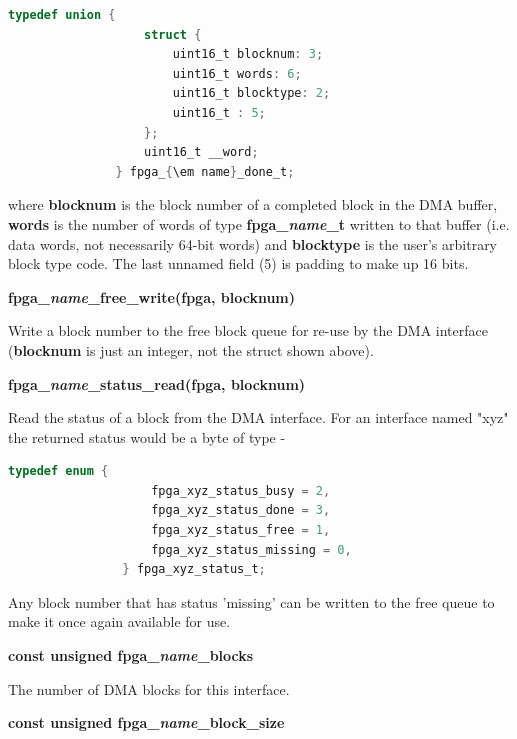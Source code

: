             \begin{lstlisting}[gobble=12, language=C]
               typedef union {
                   struct {
                       uint16_t blocknum: 3;
                       uint16_t words: 6;
                       uint16_t blocktype: 2;
                       uint16_t : 5;
                   };
                   uint16_t __word;
               } fpga_{\em name}_done_t;
            \end{lstlisting}
            where {\bf blocknum} is the
            block number of a completed block in the DMA buffer,
            {\bf words} is the number of words of type {\bf fpga\_{\em name}\_t}
            written to that buffer (i.e. data words, not necessarily 64-bit words)
            and {\bf blocktype} is the user's arbitrary block type code. The
            last unnamed field (5) is padding to make up 16 bits.
            
            {\bf fpga\_{\em name}\_free\_write(fpga, blocknum)}
            
            Write a block number to the free block queue for re-use by the
            DMA interface ({\bf blocknum} is just an integer, not the struct
            shown above).

            {\bf fpga\_{\em name}\_status\_read(fpga, blocknum)}
            
            Read the status of a block from the DMA interface.
            For an interface named "xyz" the returned status would be a
            byte of type -
            
            \begin{lstlisting}[gobble=12, language=C]
                typedef enum {
                    fpga_xyz_status_busy = 2,
                    fpga_xyz_status_done = 3,
                    fpga_xyz_status_free = 1,
                    fpga_xyz_status_missing = 0,
                } fpga_xyz_status_t;
            \end{lstlisting}
            
            Any block number that has status 'missing' can be written to the free
            queue to make it once again available for use.
            
            {\bf const unsigned fpga\_{\em name}\_blocks}
            
            The number of DMA blocks for this interface.
            
            {\bf const unsigned fpga\_{\em name}\_block\_size}
            
